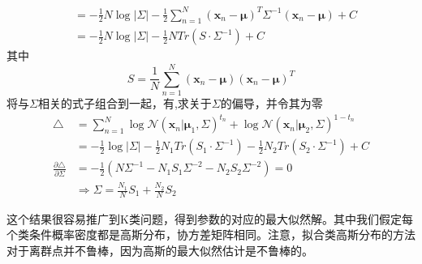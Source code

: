 \begin{enumerate}
\begin{equation}
\begin{aligned}
			&=-\frac{1}{2}N\log |\Sigma| - \frac{1}{2}\sum_{n=1}^{N}(\boldsymbol{x}_n-\boldsymbol{\mu})^T\Sigma^{-1}(\boldsymbol{x}_n-\boldsymbol{\mu})+C\\
			&=-\frac{1}{2}N\log |\Sigma|-\frac{1}{2}N Tr(S\cdot \Sigma^{-1})+C
		\end{aligned}
	\end{equation}
	其中
	\begin{equation}
		S=\frac{1}{N}\sum_{n=1}^{N}(\boldsymbol{x}_n-\boldsymbol{\mu})(\boldsymbol{x}_n-\boldsymbol{\mu})^T
	\end{equation}
	将与$\Sigma$相关的式子组合到一起，有,求关于$\Sigma$的偏导，并令其为零
	\begin{equation}
		\begin{aligned}
		\triangle &= \sum_{n=1}^{N}\log \mathcal{N}(\boldsymbol{x}_n|\boldsymbol{\mu}_1,\Sigma)^{t_n}+\log\mathcal{N}(\boldsymbol{x}_n|\boldsymbol{\mu}_2,\Sigma)^{1-t_n}\\
		&=-\frac{1}{2}\log |\Sigma|-\frac{1}{2}N_1Tr(S_1\cdot \Sigma^{-1})-\frac{1}{2}N_2Tr(S_2\cdot \Sigma^{-1})+C\\
		\frac{\partial \triangle}{\partial \Sigma}&=-\frac{1}{2}(N\Sigma^{-1}-N_1S_1\Sigma^{-2}-N_2S_2\Sigma^{-2})=0\\
		&\Rightarrow \Sigma=\frac{N_1}{N}S_1+\frac{N_2}{N}S_2
		\end{aligned}
	\end{equation}
\end{enumerate}

这个结果很容易推广到K类问题，得到参数的对应的最大似然解。其中我们假定每个类条件概率密度都是高斯分布，协方差矩阵相同。注意，拟合类高斯分布的方法对于离群点并不鲁棒，因为高斯的最大似然估计是不鲁棒的。
